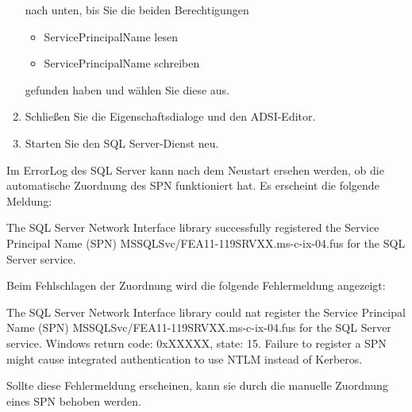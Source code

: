 \begin{enumerate}
            nach unten, bis Sie die beiden Berechtigungen
              \begin{itemize}
                \item ServicePrincipalName lesen
                \item ServicePrincipalName schreiben
              \end{itemize}
            gefunden haben und wählen Sie diese aus.
            \item Schließen Sie die Eigenschaftsdialoge und den ADSI-Editor.
            \item Starten Sie den SQL Server-Dienst neu.
          \end{enumerate}
          Im ErrorLog des SQL Server kann nach dem Neustart ersehen werden, ob
          die automatische Zuordnung des SPN funktioniert hat. Es erscheint die
          folgende Meldung:
          
          The SQL Server Network Interface library successfully registered the
          Service Principal Name (SPN) MSSQLSvc/FEA11-119SRVXX.ms-c-ix-04.fus
          for the SQL Server service.
          
          Beim Fehlschlagen der Zuordnung wird die folgende Fehlermeldung
          angezeigt:
          
          The SQL Server Network Interface library could nat register the
          Service Principal Name (SPN) MSSQLSvc/FEA11-119SRVXX.ms-c-ix-04.fus
          for the SQL Server service. Windows return code: 0xXXXXX, state: 15.
          Failure to register a SPN might cause integrated authentication to use
          NTLM instead of Kerberos.
          
          Sollte diese Fehlermeldung erscheinen, kann sie durch die manuelle
          Zuordnung eines SPN behoben werden.
          \begin{literaturinternet}
            \item \cite{btmcm210tsnilwutrs}
            \item \cite{mswcttssnilcnrtspns}
            \item \cite{ms191153}
          \end{literaturinternet}
